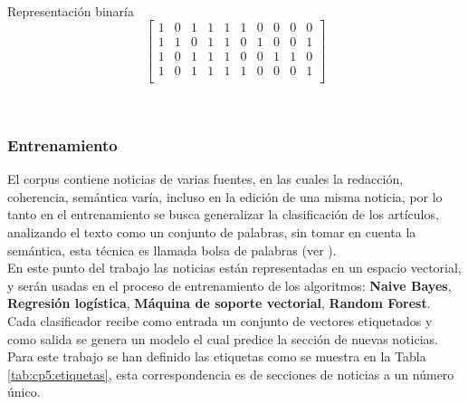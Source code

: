 \ \\

\begin{mygraybox}[label={box:cp5:binario}]{Representación binaría} 
\begin{equation*}
\begin{bmatrix}
1 & 0 & 1 & 1 & 1 & 1 & 0 & 0 & 0 & 0\\
1 & 1 & 0 & 1 & 1 & 0 & 1 & 0 & 0 & 1\\
1 & 0 & 1 & 1 & 1 & 0 & 0 & 1 & 1 & 0\\
1 & 0 & 1 & 1 & 1 & 1 & 0 & 0 & 0 & 1\\
\end{bmatrix}
\end{equation*}
\end{mygraybox}

\ \\

\subsubsection{Entrenamiento}


El corpus contiene noticias de varias fuentes, en  las cuales la redacción, coherencia, semántica varía, incluso en la edición de una misma noticia, por lo tanto en el entrenamiento se busca generalizar la clasificación de los artículos, analizando el texto como un conjunto de palabras, sin tomar en cuenta la semántica, esta técnica es llamada bolsa de palabras (ver ).\\

En este punto del trabajo las noticias están representadas en un espacio vectorial, y serán usadas en el proceso de entrenamiento de los algoritmos: \textbf{Naive Bayes}, \textbf{Regresión logística}, \textbf{Máquina de soporte vectorial}, \textbf{Random Forest}. Cada clasificador recibe como entrada un conjunto de vectores etiquetados y como salida se genera un modelo el cual predice la sección de nuevas noticias.\\ 

Para este trabajo se han definido las etiquetas como se muestra en la Tabla \ref{tab:cp5:etiquetas}, esta correspondencia es de secciones de noticias a un número único.\\


